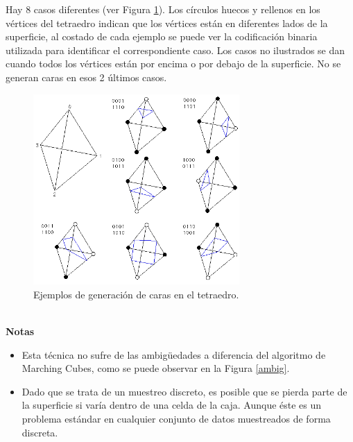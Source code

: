 \documentclass[12pt]{article}
\begin{document}
Hay 8 casos diferentes (ver Figura \ref{tet}). Los círculos huecos y rellenos en los vértices del tetraedro indican que los vértices están en diferentes lados de la superficie, al costado de cada ejemplo se puede ver la codificación binaria utilizada para identificar el correspondiente caso. Los casos no ilustrados se dan cuando todos los vértices están por encima o por debajo de la superficie. No se generan caras en esos 2 últimos casos.
\begin{figure}[h!]
\includegraphics[width=0.7\textwidth,center]{mt2.png}
\caption{Ejemplos de generación de caras en el tetraedro.}
\label{tet}
\end{figure}\\
\textbf{Notas}
\begin{itemize}
\item Esta técnica no sufre de las ambigüedades a diferencia del algoritmo de Marching Cubes, como se puede observar en la Figura \ref{ambig}.
\item Dado que se trata de un muestreo discreto, es posible que se pierda parte de la superficie si varía dentro de una celda de la caja. Aunque éste es un problema estándar en cualquier conjunto de datos muestreados de forma discreta.
\end{itemize}
\end{document}
